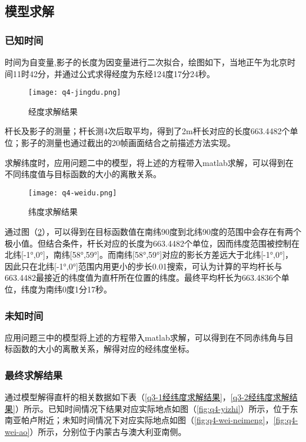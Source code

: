 \documentclass[withoutpreface,bwprint]{cumcmthesis} %
\begin{document}
\subsection{模型求解}

\subsubsection{已知时间}

时间为自变量,影子的长度为因变量进行二次拟合，绘图如下，当地正午为北京时间11时42分，并通过公式求得经度为东经124度17分24秒。
\begin{figure}[h]
\small
\centering
\texttt{[image: q4-jingdu.png]}
\caption{经度求解结果} \label{fig:q4-jingdu}
\end{figure}

\par 杆长及影子的测量；杆长测4次后取平均，得到了2m杆长对应的长度663.4482个单位；影子的测量也通过截出的20帧画面结合之前描述方法实现。
\par 求解纬度时，应用问题二中的模型，将上述的方程带入matlab求解，可以得到在不同纬度值与目标函数的大小的离散关系。

\begin{figure}[h]
\small
\centering
\texttt{[image: q4-weidu.png]}
\caption{纬度求解结果} \label{fig:q4-weidu}
\end{figure}

\par 通过图（\ref{fig:q4-weidu}），可以得到在目标函数值在南纬90度到北纬90度的范围中会存在有两个极小值。但结合条件，杆长对应的长度为663.4482个单位，因而纬度范围被控制在北纬[-1°,0°]，南纬[58°,59°]。而南纬[58°,59°]对应的影长方差远大于北纬[-1°,0°]，因此只在北纬[-1°,0°]范围内用更小的步长0.01搜索，可认为计算的平均杆长与663.4482最接近的纬度值为直杆所在位置的纬度。最终平均杆长为663.4836个单位，纬度为南纬0度1分17秒。

\subsubsection{未知时间}
应用问题三中的模型将上述的方程带入matlab求解，可以得到在不同赤纬角与目标函数的大小的离散关系，解得对应的经纬度坐标。

\subsubsection{最终求解结果}
通过模型解得直杆的相关数据如下表（\ref{q3-1经纬度求解结果}，\ref{q3-2经纬度求解结果}）所示。已知时间情况下结果对应实际地点如图（\ref{fig:q4-yizhi}）所示，位于东南亚帕卢附近；未知时间情况下对应实际地点如图（\ref{fig:q4-wei-neimeng}，\ref{fig:q4-wei-ao}）所示，分别位于内蒙古与澳大利亚南侧。
\end{document}
